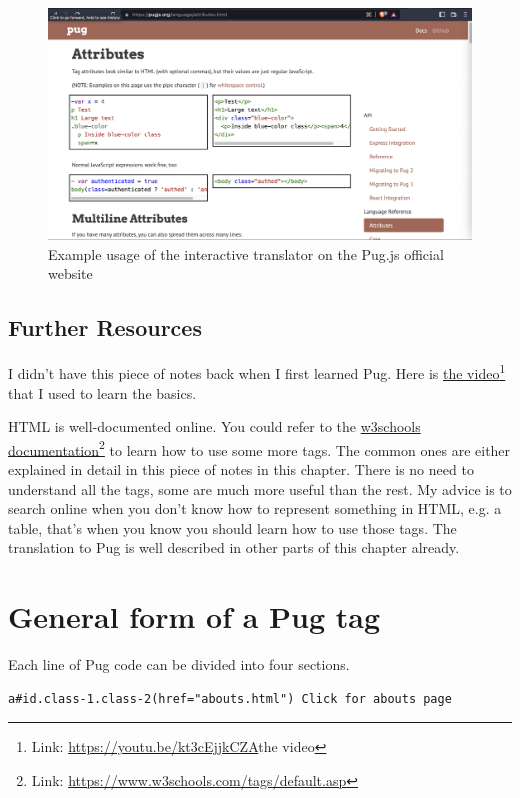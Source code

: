 \begin{figure}[h]
\centering
\includegraphics[width=13cm]{images/ch5-puginteractive.png}
\caption{Example usage of the interactive translator on the Pug.js official website}
\end{figure}

\subsection*{Further Resources}

I didn't have this piece of notes back when I first learned Pug. Here is \href{https://youtu.be/kt3cEjjkCZA}{the video}\footnote{Link: \url{https://youtu.be/kt3cEjjkCZA}{the video}} that I used to learn the basics. 

HTML is well-documented online. You could refer to the \href{https://www.w3schools.com/tags/default.asp}{w3schools documentation}\footnote{Link: \url{https://www.w3schools.com/tags/default.asp}} to learn how to use some more tags. The common ones are either explained in detail in this piece of notes in this chapter. There is no need to understand all the tags, some are much more useful than the rest. My advice is to search online when you don't know how to represent something in HTML, e.g. a table, that's when you know you should learn how to use those tags. The translation to Pug is well described in other parts of this chapter already.

\section{General form of a Pug tag}

Each line of Pug code can be divided into four sections.

\begin{lstlisting}[language=pug]
a#id.class-1.class-2(href="abouts.html") Click for abouts page
\end{lstlisting}

